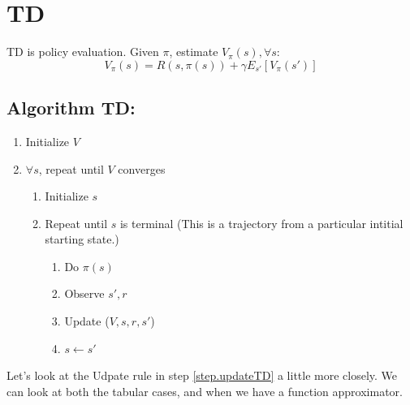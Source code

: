 \documentclass[11pt]{article}
\numberwithin{equation}{section}
\numberwithin{figure}{section}
\begin{document}
\section{TD}
TD is policy evaluation. Given $\pi$, estimate $V_\pi(s), \forall s$:
\begin{equation}
	V_\pi(s) = R(s,\pi(s)) + \gamma E_{s'}[V_\pi(s')]
	\label{eq.valueTD}
\end{equation}

\subsection*{Algorithm TD:}

\begin{enumerate}
	\item Initialize $V$
	\item $\forall s$, repeat until $V$ converges
	\begin{enumerate}
		\item Initialize $s$
		\item Repeat until $s$ is terminal (This is a trajectory from a particular intitial starting state.)
		\begin{enumerate}
			\item Do $\pi(s)$
			\item Observe $s', r$
			\item Update ($V, s, r, s'$)
			\label{step.updateTD}
			\item $s \leftarrow s'$
		\end{enumerate}		
	\end{enumerate}		
\end{enumerate}		

Let's look at the Udpate rule in step \ref{step.updateTD} a little more closely.  We can look at both the tabular cases, and when we have a function approximator.

\end{document}
